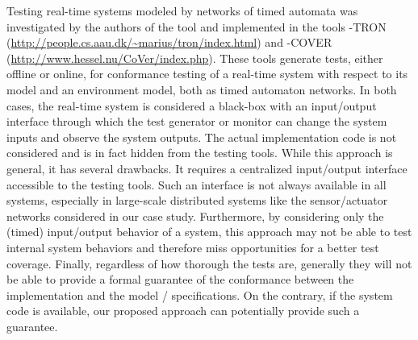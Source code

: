 Testing real-time systems modeled by networks of timed automata was
investigated by the authors of the tool \uppaal
\cite{uppaaltron2008,uppaalcover2007,uppaaltron2005} and implemented
in the tools \uppaal-TRON
(\url{http://people.cs.aau.dk/~marius/tron/index.html}) and
\uppaal-COVER
 (\url{http://www.hessel.nu/CoVer/index.php}).  These tools generate
tests, either offline or online, for conformance testing of a
real-time system with respect to its model and an environment model,
both as timed automaton networks.  In both cases, the real-time system
is considered a black-box with an input/output interface through which
the test generator or monitor can change the system inputs and observe
the system outputs.  The actual implementation code is not considered
and is in fact hidden from the testing tools.  While this approach is
general, it has several drawbacks.  It requires a centralized
input/output interface accessible to the testing tools.  Such an
interface is not always available in all systems, especially in
large-scale distributed systems like the sensor/actuator networks
considered in our case study.  Furthermore, by considering only the
(timed) input/output behavior of a system, this approach may not be
able to test internal system behaviors and therefore miss
opportunities for a better test
coverage.  %
Finally, regardless of how thorough the tests are, generally they will
not be able to provide a formal guarantee of the conformance between
the implementation and the model / specifications.  On the contrary,
if the system code is available, our proposed
approach can potentially provide such a
guarantee.



